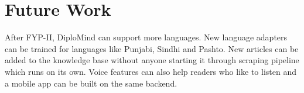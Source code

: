 \documentclass{FastFyp}
\begin{document}
\section{Future Work}

After FYP-II, DiploMind can support more languages. New language adapters can be trained for languages like Punjabi, Sindhi and Pashto. New articles can be added to the knowledge base without anyone starting it through scraping pipeline which runs on its own. Voice features can also help readers who like to listen and a mobile app can be built on the same backend. 

\end{document}
